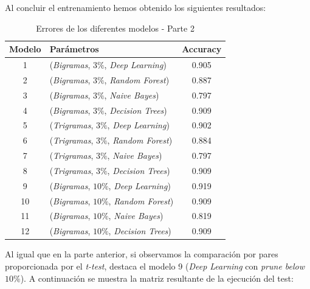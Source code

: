 \documentclass[es]{uc3mreport}
\begin{document}
\begin{report}
    Al concluir el entrenamiento hemos obtenido los siguientes resultados:

    \begin{table}[H]
        \begin{center}
            \begin{tabular}{ @{}clc@{} }
                \toprule
                Modelo & Parámetros\footnotemark[2] & Accuracy\\
                \midrule
                1  & (\textit{Bigramas},  $3\%$, \textit{Deep Learning})  & 0.905\\
                2  & (\textit{Bigramas},  $3\%$, \textit{Random Forest})  & 0.887\\
                3  & (\textit{Bigramas},  $3\%$, \textit{Naive Bayes})    & 0.797\\
                4  & (\textit{Bigramas},  $3\%$, \textit{Decision Trees}) & 0.909\\
                5  & (\textit{Trigramas}, $3\%$, \textit{Deep Learning})  & 0.902\\
                6  & (\textit{Trigramas}, $3\%$, \textit{Random Forest})  & 0.884\\
                7  & (\textit{Trigramas}, $3\%$, \textit{Naive Bayes})    & 0.797\\
                8  & (\textit{Trigramas}, $3\%$, \textit{Decision Trees}) & 0.909\\
                9  & (\textit{Bigramas}, $10\%$, \textit{Deep Learning})  & 0.919\\
                10 & (\textit{Bigramas}, $10\%$, \textit{Random Forest})  & 0.909\\
                11 & (\textit{Bigramas}, $10\%$, \textit{Naive Bayes})    & 0.819\\
                12 & (\textit{Bigramas}, $10\%$, \textit{Decision Trees}) & 0.909\\
                \bottomrule
            \end{tabular}
            \caption{Errores de los diferentes modelos - Parte 2}
        \end{center}
    \end{table}

    Al igual que en la parte anterior, si observamos la comparación por pares
    proporcionada por el \textit{t-test}, destaca el modelo 9 (\textit{Deep Learning}
    con \textit{prune below $10\%$}). A continuación se muestra la matriz resultante
    de la ejecución del test:


\end{report}
\end{document}
